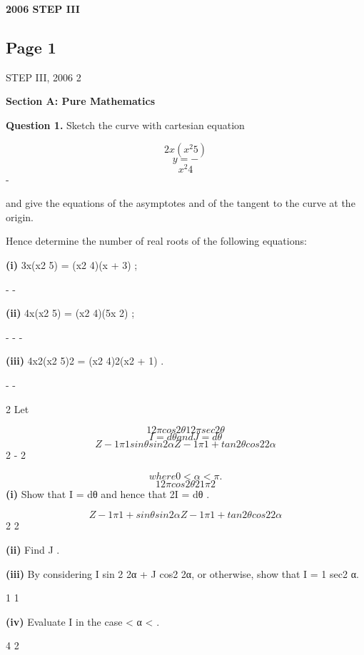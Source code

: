 \documentclass[12pt]{article}
\begin{document}
\begin{center}
{\Large \textbf{2006 STEP III}}
\end{center}

\subsection*{Page 1}
\begin{flushleft}
STEP III, 2006 2\par
\bigskip\textbf{Section A: Pure Mathematics}\par
\bigskip\textbf{Question 1.} Sketch the curve with cartesian equation\par
\[2x(x^2 5)\]
\[y = -\]
\[x^2 4\]
-\par
and give the equations of the asymptotes and of the tangent to the curve at the origin.\par
Hence determine the number of real roots of the following equations:\par
\textbf{(i)} 3x(x2 5) = (x2 4)(x + 3) ;\par
- -\par
\textbf{(ii)} 4x(x2 5) = (x2 4)(5x 2) ;\par
- - -\par
\textbf{(iii)} 4x2(x2 5)2 = (x2 4)2(x2 + 1) .\par
- -\par
2 Let\par
\[1 2 \pi cos2 θ 1 2 \pi sec2 θ\]
\[I = dθ and J = dθ\]
\[Z- 1 \pi 1 sin θ sin 2α Z- 1 \pi 1 + tan2 θ cos2 2α\]
2 - 2\par
\[where 0 < α < \pi .\]
\[1 2 \pi cos2 θ 2 1 \pi 2\]
\textbf{(i)} Show that I = dθ and hence that 2I = dθ .\par
\[Z- 1 \pi 1 + sin θ sin 2α Z- 1 \pi 1 + tan2 θ cos2 2α\]
2 2\par
\textbf{(ii)} Find J .\par
\textbf{(iii)} By considering I sin 2 2α + J cos2 2α, or otherwise, show that I = 1 \pi sec2 α.\par
1 1\par
\textbf{(iv)} Evaluate I in the case \pi < α < \pi.\par
4 2\par
\end{flushleft}
\end{document}
